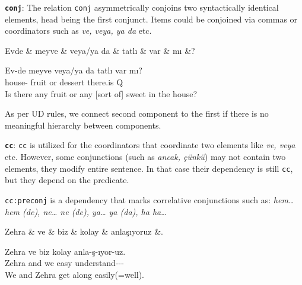 \documentclass[11pt,a4paper]{article}
\begin{document}
\textbf{\texttt{conj}}:
The relation \texttt{conj} asymmetrically conjoins two syntactically identical elements, head being the first conjunct. Items could be conjoined via commas or coordinators such as \textit{ve, veya, ya da} etc. 

\begin{exe}
\ex \label{conj}
\begin{dependency}
\begin{deptext}[column sep=0.32cm]
Evde \& meyve \& veya/ya da \& tatlı \& var \& mı \&? \\
\end{deptext}
\end{dependency}
\gll Ev-de meyve veya/ya da tatlı var mı? \\
house-\Loc{} fruit or dessert there.is Q \\
\glt Is there any fruit or any [sort of] sweet in the house?
\end{exe}

As per UD rules, we connect second component to the first if there is no meaningful hierarchy between components.

\textbf{\texttt{cc}}:
\texttt{cc} is utilized for the coordinators that coordinate two elements like \textit{ve, veya} etc. However, some conjunctions (such as \textit{ancak, çünkü}) may not contain two elements, they modify entire sentence. In that case their dependency is still \texttt{cc}, but they depend on the predicate.

\texttt{cc:preconj} is a dependency that marks correlative conjunctions such as: \textit{hem… hem (de), ne… ne (de), ya… ya (da), ha ha}…

\begin{exe}
\ex \label{cc}
\begin{dependency}
\begin{deptext}[column sep=0.24cm]
Zehra \& ve \& biz \& kolay \& anlaşıyoruz \&. \\
\end{deptext}
\end{dependency}
\gll Zehra ve biz kolay anla-ş-ıyor-uz. \\
Zehra and we easy understand-\Refl{}-\Prog{}-\Fpl{}\\
\glt We and Zehra get along easily(=well).
\end{exe}
\end{document}

